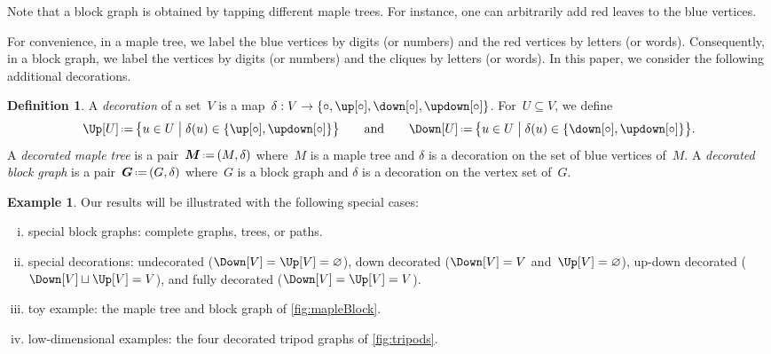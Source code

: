 \documentclass{amsart}
\theoremstyle{definition}
\newtheorem{definition}[theorem]{Definition}
\newtheorem{example}[theorem]{Example}
\renewcommand{\b}[1]{{\boldsymbol{#1}}} %
\newcommand{\bigset}[2]{\big\{ #1 \;\big|\; #2 \big\}} %
\newcommand{\eqdef}{\mbox{\,\raisebox{0.2ex}{\scriptsize\ensuremath{\mathrm:}}\ensuremath{=}\,}} %
\newcommand{\darkblue}{\color{darkblue}} %
\newcommand{\defn}[1]{\textsl{\darkblue #1}} %
\newcommand{\vertexSet}{V}
\newcommand{\decoration}{\delta}
\begin{document}
Note that a block graph is obtained by tapping different maple trees. For instance, one can arbitrarily add red leaves to the blue vertices.

For convenience, in a maple tree, we label the blue vertices by digits (or numbers) and the red vertices by letters (or words).
Consequently, in a block graph, we label the vertices by digits (or numbers) and the cliques by letters (or words).
In this paper, we consider the following additional decorations.

\begin{definition}
  A \defn{decoration} of a set~$\vertexSet$ is a map~$\decoration : \vertexSet \to \{\circ, \up[\circ], \down[\circ], \updown[\circ]\}$.
  For~$U \subseteq \vertexSet$, we define
  \[
    \Up[U] \eqdef \bigset{u \in U}{\decoration(u) \in \{\up[\circ], \updown[\circ]\}}
    \qquad\text{and}\qquad
    \Down[U] \eqdef \bigset{u \in U}{\decoration(u) \in \{\down[\circ], \updown[\circ]\}}.
  \]
  A \defn{decorated maple tree} is a pair~$\b{M} \eqdef (M,\decoration)$ where~$M$ is a maple tree and $\decoration$ is a decoration on the set of blue vertices of~$M$.
  A \defn{decorated block graph} is a pair~$\b{G} \eqdef (G,\decoration)$ where~$G$ is a block graph and $\decoration$ is a decoration on the vertex set of~$G$.
\end{definition}

\begin{example}
  \label{exm:specialGraphs}
  Our results will be illustrated with the following special cases:
  \begin{enumerate}[(i)]
    \item special block graphs: complete graphs, trees, or paths.
    \item special decorations: undecorated ($\Down[\vertexSet] = \Up[\vertexSet] = \varnothing$), down decorated ($\Down[\vertexSet] = \vertexSet$ and~${\Up[\vertexSet] = \varnothing}$), up-down decorated ($\Down[\vertexSet] \sqcup \Up[\vertexSet] = \vertexSet$), and fully decorated ($\Down[\vertexSet] = \Up[\vertexSet] = \vertexSet$).
    \item toy example: the maple tree and block graph of \cref{fig:mapleBlock}.
    \item low-dimensional examples: the four decorated tripod graphs of \cref{fig:tripods}.
  \end{enumerate}
\end{example}
\end{document}

